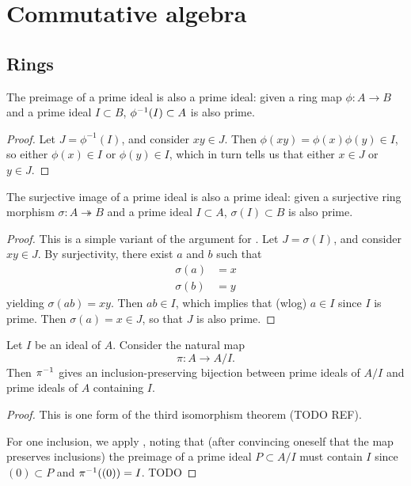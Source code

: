 \chapter{Commutative algebra}

\section{Rings}
\label{sec:rings}

\begin{prop}%
  \label{prop:preimage-of-prime-is-prime}
  The preimage of a prime ideal is also a prime ideal: given a ring map $\phi :
  A \to B$ and a prime ideal $I \subset B$, ${\phi}^{-1}(I) \subset A$ is also
  prime.
\end{prop}
\begin{proof}
  Let $J = \phi^{-1}(I)$, and consider $xy \in J$. Then $\phi(xy) =
  \phi(x)\phi(y) \in I$, so either $\phi(x) \in I$ or $\phi(y) \in I$, which in
  turn tells us that either $x \in J$ or $y \in J$.
\end{proof}

\begin{prop}%
  \label{prop:surjective-image-of-prime-is-prime}
  The surjective image of a prime ideal is also a prime ideal: given a
  surjective ring morphism $\sigma : A \twoheadrightarrow B$ and a prime ideal
  $I \subset A$, $\sigma(I) \subset B$ is also prime.
\end{prop}
\begin{proof}
  This is a simple variant of the argument for
  . Let $J = \sigma(I)$, and consider $xy
  \in J$. By surjectivity, there exist $a$ and $b$ such that
  \begin{align*}
    \sigma(a) &= x\\
    \sigma(b) &= y
  \end{align*}
  yielding $\sigma(ab) = xy$. Then $ab \in I$, which implies that (wlog) $a \in
  I$ since $I$ is prime. Then $\sigma(a) = x \in J$, so that $J$ is also prime.
\end{proof}

\begin{prop}
  \label{prop:inclusion-preserving-bijection-quotient}
  Let $I$ be an ideal of $A$. Consider the natural map
  \[\pi : A \to A/I.\]
  Then ${\pi}^{-1}$ gives an inclusion-preserving bijection between prime ideals of
  $A/I$ and prime ideals of $A$ containing $I$.
\end{prop}
\begin{proof}
  This is one form of the third isomorphism theorem (TODO REF).

  \medskip\noindent
  For one inclusion, we apply , noting
  that (after convincing oneself that the map preserves inclusions) the preimage
  of a prime ideal $P \subset A/I$ must contain $I$ since $(0) \subset P$ and
  ${\pi}^{-1}((0)) = I$. TODO
\end{proof}

